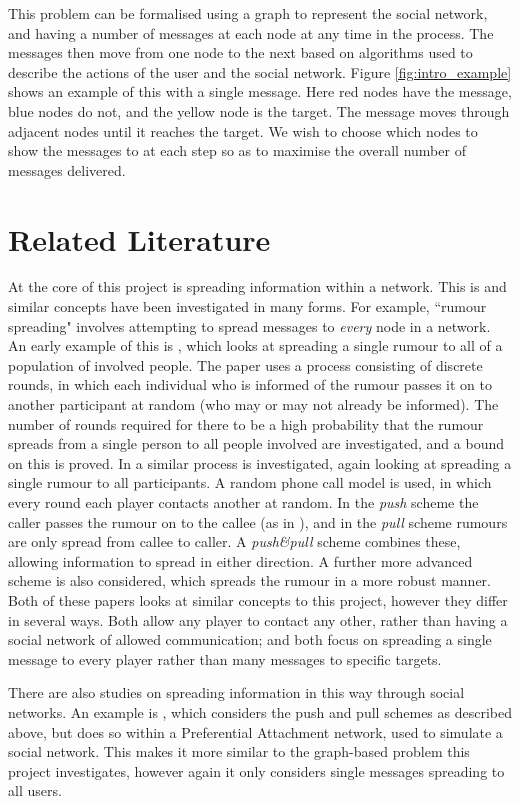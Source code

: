 \documentclass[bsc,frontabs,twoside,singlespacing,parskip,deptreport]{infthesis}     %
\begin{document}
This problem can be formalised using a graph to represent the social network, and having a number of messages at each node at any time in the process. The messages then move from one node to the next based on algorithms used to describe the actions of the user and the social network. Figure \ref{fig:intro_example} shows an example of this with a single message. Here red nodes have the message, blue nodes do not, and the yellow node is the target. The message moves through adjacent nodes until it reaches the target. We wish to choose which nodes to show the messages to at each step so as to maximise the overall number of messages delivered.


\section{Related Literature}
At the core of this project is spreading information within a network. This is and similar concepts have been investigated in many forms. For example, ``rumour spreading" involves attempting to spread messages to \textit{every} node in a network. An early example of this is \cite{Pittel87}, which looks at spreading a single rumour to all of a population of involved people. The paper uses a process consisting of discrete rounds, in which each individual who is informed of the rumour passes it on to another participant at random (who may or may not already be informed). The number of rounds required for there to be a high probability that the rumour spreads from a single person to all people involved are investigated, and a bound on this is proved. In \cite{KarpSSV00} a similar process is investigated, again looking at spreading a single rumour to all participants. A random phone call model is used, in which every round each player contacts another at random. In the \textit{push} scheme the caller passes the rumour on to the callee (as in \cite{Pittel87}), and in the \textit{pull} scheme rumours are only spread from callee to caller. A \textit{push\&pull} scheme combines these, allowing information to spread in either direction. A further more advanced scheme is also considered, which spreads the rumour in a more robust manner. Both of these papers looks at similar concepts to this project, however they differ in several ways. Both allow any player to contact any other, rather than having a social network of allowed communication; and both focus on spreading a single message to every player rather than many messages to specific targets.

There are also studies on spreading information in this way through social networks. An example is \cite{SocialNetworkRumours}, which considers the push and pull schemes as described above, but does so within a Preferential Attachment network, used to simulate a social network. This makes it more similar to the graph-based problem this project investigates, however again it only considers single messages spreading to all users.
\end{document}
